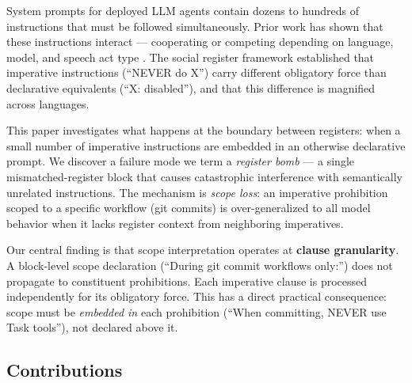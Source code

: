 \documentclass[11pt,a4paper]{article}
\begin{document}
System prompts for deployed LLM agents contain dozens to hundreds of
instructions that must be followed simultaneously. Prior work has shown
that these instructions interact --- cooperating or competing depending
on language, model, and speech act type \citep{mason2026arbiter,
mason2026register}. The social register framework established that
imperative instructions (``NEVER do X'') carry different obligatory
force than declarative equivalents (``X: disabled''), and that this
difference is magnified across languages.

This paper investigates what happens at the boundary between registers:
when a small number of imperative instructions are embedded in an
otherwise declarative prompt. We discover a failure mode we term a
\emph{register bomb} --- a single mismatched-register block that
causes catastrophic interference with semantically unrelated
instructions. The mechanism is \emph{scope loss}: an imperative
prohibition scoped to a specific workflow (git commits) is
over-generalized to all model behavior when it lacks register context
from neighboring imperatives.

\begin{center}
\end{center}

Our central finding is that scope interpretation operates at
\textbf{clause granularity}. A block-level scope declaration
(``During git commit workflows only:'') does not propagate to
constituent prohibitions. Each imperative clause is processed
independently for its obligatory force. This has a direct practical
consequence: scope must be \emph{embedded in} each prohibition
(``When committing, NEVER use Task tools''), not declared above it.

\subsection{Contributions}
\end{document}
